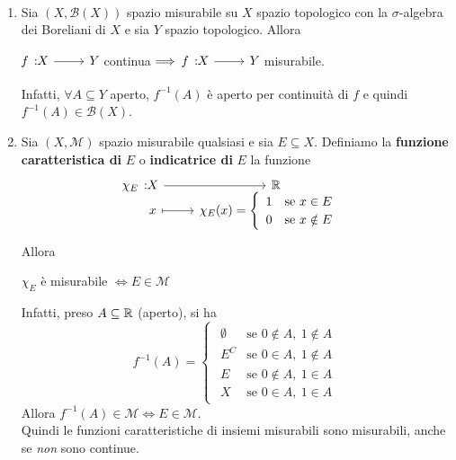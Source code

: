 \begin{examples}~{}
	\begin{enumerate}
		\item Sia $\left(X,\mathcal{B}(X)\right)$ spazio misurabile su $X$ spazio topologico con la $\sigma$-algebra dei Boreliani di $X$ e sia $Y$ spazio topologico. Allora
		\begin{center}
			$\funz{f}{X}{Y}$ continua$\implies \funz{f}{X}{Y}$ misurabile.
		\end{center}
	Infatti, $\forall A\subseteq Y$ aperto, $f^{-1}\left(A\right)$ è aperto per continuità di $f$ e quindi $f^{-1}\left(A\right)\in\mathcal{B}(X)$.
	\item Sia $\left(X,\mathcal{M}\right)$ spazio misurabile qualsiasi e sia $E\subseteq X$. Definiamo la \textbf{funzione caratteristica di} $E$ o \textbf{indicatrice di} $E$ la funzione
	\begin{equation}
		\funztot{\chi_E}{X}{\realset}{x}{\chi_E(x)=\begin{cases}
				\begin{array}{ll}
					1&\text{se }x\in E\\
					0&\text{se }x\notin E\\
				\end{array}
		\end{cases}}
	\end{equation}
Allora
\begin{center}
$\chi_E$ è misurabile $\iff E\in\mathcal{M}$
\end{center}
Infatti, preso $A\subseteq \mathbb{R}$ (aperto), si ha
\begin{equation*}
f^{-1}\left(A\right)=\begin{cases}
	\begin{array}{ll}
		\emptyset&\text{se }0\notin A,\ 1\notin A\\
		E^C&\text{se }0\in A,\ 1\notin A\\
		E&\text{se }0\notin A,\ 1\in A\\
		X&\text{se }0\in A,\ 1\in A
	\end{array}
\end{cases}
\end{equation*}
Allora $f^{-1}\left(A\right)\in\mathcal{M}\iff E\in\mathcal{M}$.\\
Quindi le funzioni caratteristiche di insiemi misurabili sono misurabili, anche se \textit{non} sono continue.
\end{enumerate}
\end{examples}
